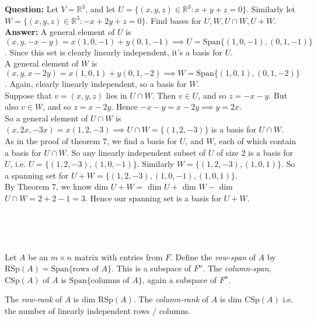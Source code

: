 \begin{example} \textbf{Question:}  
 Let $V = \mathbb{R}^3$, and let $U= \{(x,y,z) \in \mathbb{R}^3: x + y + z = 0\}.$ Similarly let $W = \{(x,y,z) \in \mathbb{R}^3: -x + 2y + z = 0\}.$ Find bases for $U, W, U \cap W, U + W$. \\

\textbf{Answer:} A general element of $U$ is $(x,y,-x-y) = x(1,0,-1) + y(0,1,-1) \implies U = \text{Span}\{(1,0,-1),(0,1,-1)\}$. Since this set is clearly linearly independent, it's a basis for $U$.\\

A general element of $W$ is $(x,y,x-2y) = x(1,0,1) + y(0,1,-2) \implies W = \text{Span}\{(1,0,1),(0,1,-2)\}$. Again, clearly linearly independent, so a basis for $W$.\\

Suppose that $v = (x,y,z)$ lies in $U \cap W$. Then $v \in U$, and so $z = -x-y$. But also $v \in W$, and so $z = x - 2y$. Hence $-x-y = x-2y \implies y = 2x$.\\

So a general element of $U \cap W$ is $(x,2x,-3x) = x(1,2,-3) \implies U\cap W = \{(1,2,-3)\} $ is a basis for $U\cap W$.\\


As in the proof of theorem 7, we find a basis for $U$, and $W$, each of which contain a basis for $U \cap W$. So any linearly independent subset of $U$ of size 2 is a basis for $U$, i.e. $U = \{(1,2,-3),(1,0,-1)\}$. Similarly $W = \{(1,2,-3),(1,0,1)\} $. So a spanning set for $U + W = \{(1,2,-3),(1,0,-1),(1,0,1)\}$.\\

By Theorem 7, we know dim $U+W = $ dim $U + $ dim $W - $ dim $U\cap W = 2 + 2 -1 = 3.$ Hence our spanning set is a basis for $U + W$.
\end{example}~


~

\begin{definition}Let $A$ be an $m \times n$ matrix with entries from $F$. Define the \emph{row-span} of $A$ by $\text{RSp}(A) = \text{Span}\{\text{rows of }A\}$. This is a subspace of $F^n$. The \emph{column-span}, $\text{CSp}(A)$ of $A$ is  $\text{Span}\{\text{columns of }A\}$, again a subspace of $F^n$.	

The \emph{row-rank} of $A$ is dim $\text{RSp}(A)$. The \emph{column-rank} of $A$ is dim $\text{CSp}(A)$ i.e. the number of linearly independent rows / columns.
\end{definition}


